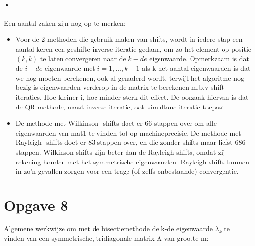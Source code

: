 \documentclass[]{article}
\newcommand{\opgave}[1]{\section*{Opgave #1}}
\begin{document}
\begin{table}
\noindent{}
\caption{convergentie QR methodes voor eigenwaardenberekening}
\label{tabelOpgave4}
\end{table}

\paragraph{•}
Een aantal zaken zijn nog op te merken:
\begin{itemize}
	\item Voor de 2 methoden die gebruik maken van shifts, wordt in iedere stap een aantal keren een geshifte inverse iteratie gedaan, om zo het element op positie $(k,k)$ te laten convergeren naar de $k-de$ eigenwaarde. Opmerkzaam is dat de $i-de$ eigenwaarde met $i = 1,\dots,k-1$ als k het aantal eigenwaarden is dat we nog moeten berekenen, ook al genaderd wordt, terwijl het algoritme nog bezig is eigenwaarden verderop in de matrix te berekenen m.b.v shift- iteraties. Hoe kleiner i, hoe minder sterk dit effect. De oorzaak hiervan is dat de QR methode, naast inverse iteratie, ook simultane iteratie toepast.
	\item De methode met Wilkinson- shifts doet er 66 stappen over om alle eigenwaarden van mat1 te vinden tot op machineprecisie. De methode met Rayleigh- shifts doet er 83 stappen over, en die zonder shifts maar liefst 686 stappen. Wilkinson shifts zijn beter dan de Rayleigh shifts, omdat zij rekening houden met het symmetrische eigenwaarden. Rayleigh shifts kunnen in zo'n gevallen zorgen voor een trage (of zelfs onbestaande) convergentie.
\end{itemize}


\opgave{8}

Algemene werkwijze om met de bisectiemethode de k-de eigenwaarde $\lambda_k$ te vinden van een symmetrische, tridiagonale matrix A van grootte m:
\end{document}
